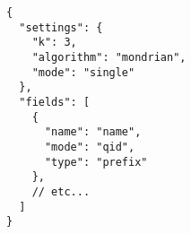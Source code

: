 \begin{lstlisting}[caption=Original input format,label=lst:original_format,float,floatplacement=H]
{
  "settings": {
    "k": 3,
    "algorithm": "mondrian",
    "mode": "single"
  },
  "fields": [
    {
      "name": "name",
      "mode": "qid",
      "type": "prefix"
    },
    // etc...
  ]
}
\end{lstlisting}
